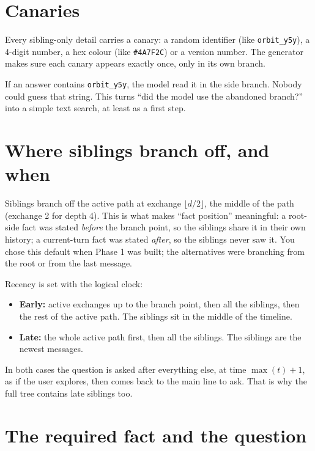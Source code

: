\section{Canaries}

Every sibling-only detail carries a canary: a random identifier (like \texttt{orbit\_y5y}), a 4-digit number, a hex colour (like \texttt{\#4A7F2C}) or a version number. The generator makes sure each canary appears exactly once, only in its own branch.

\begin{plain}
If an answer contains \texttt{orbit\_y5y}, the model read it in the side branch. Nobody could guess that string. This turns ``did the model use the abandoned branch?'' into a simple text search, at least as a first step.
\end{plain}

\section{Where siblings branch off, and when}

\begin{why}
Siblings branch off the active path at exchange $\lfloor d/2 \rfloor$, the middle of the path (exchange 2 for depth 4). This is what makes ``fact position'' meaningful: a root-side fact was stated \emph{before} the branch point, so the siblings share it in their own history; a current-turn fact was stated \emph{after}, so the siblings never saw it. You chose this default when Phase 1 was built; the alternatives were branching from the root or from the last message.
\end{why}

Recency is set with the logical clock:
\begin{itemize}
\item \textbf{Early:} active exchanges up to the branch point, then all the siblings, then the rest of the active path. The siblings sit in the middle of the timeline.
\item \textbf{Late:} the whole active path first, then all the siblings. The siblings are the newest messages.
\end{itemize}

In both cases the question is asked after everything else, at time $\max(t) + 1$, as if the user explores, then comes back to the main line to ask. That is why the full tree contains late siblings too.

\section{The required fact and the question}

